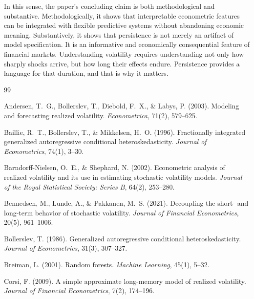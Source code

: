 \documentclass[12pt]{article}
\begin{document}
In this sense, the paper's concluding claim is both methodological and substantive. Methodologically, it shows that interpretable econometric features can be integrated with flexible predictive systems without abandoning economic meaning. Substantively, it shows that persistence is not merely an artifact of model specification. It is an informative and economically consequential feature of financial markets. Understanding volatility requires understanding not only how sharply shocks arrive, but how long their effects endure. Persistence provides a language for that duration, and that is why it matters.





\begin{thebibliography}{99}

Andersen, T.~G., Bollerslev, T., Diebold, F.~X., \& Labys, P. (2003).
\newblock Modeling and forecasting realized volatility.
\newblock \textit{Econometrica}, 71(2), 579--625.

Baillie, R.~T., Bollerslev, T., \& Mikkelsen, H.~O. (1996).
\newblock Fractionally integrated generalized autoregressive conditional heteroskedasticity.
\newblock \textit{Journal of Econometrics}, 74(1), 3--30.

Barndorff-Nielsen, O.~E., \& Shephard, N. (2002).
\newblock Econometric analysis of realized volatility and its use in estimating stochastic volatility models.
\newblock \textit{Journal of the Royal Statistical Society: Series B}, 64(2), 253--280.

Bennedsen, M., Lunde, A., \& Pakkanen, M.~S. (2021).
\newblock Decoupling the short- and long-term behavior of stochastic volatility.
\newblock \textit{Journal of Financial Econometrics}, 20(5), 961--1006.

Bollerslev, T. (1986).
\newblock Generalized autoregressive conditional heteroskedasticity.
\newblock \textit{Journal of Econometrics}, 31(3), 307--327.

Breiman, L. (2001).
\newblock Random forests.
\newblock \textit{Machine Learning}, 45(1), 5--32.

Corsi, F. (2009).
\newblock A simple approximate long-memory model of realized volatility.
\newblock \textit{Journal of Financial Econometrics}, 7(2), 174--196.


\end{thebibliography}
\end{document}
